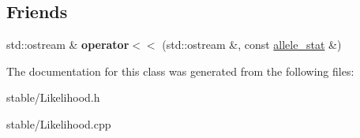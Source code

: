 \subsection*{Friends}
\begin{DoxyCompactItemize}
\item 
\hypertarget{classallele__stat_a3b57c3b3704522365fb3d4901af810e9}{std\-::ostream \& {\bfseries operator$<$$<$} (std\-::ostream \&, const \hyperlink{classallele__stat}{allele\-\_\-stat} \&)}\label{classallele__stat_a3b57c3b3704522365fb3d4901af810e9}

\end{DoxyCompactItemize}


The documentation for this class was generated from the following files\-:\begin{DoxyCompactItemize}
\item 
stable/Likelihood.\-h\item 
stable/Likelihood.\-cpp\end{DoxyCompactItemize}

